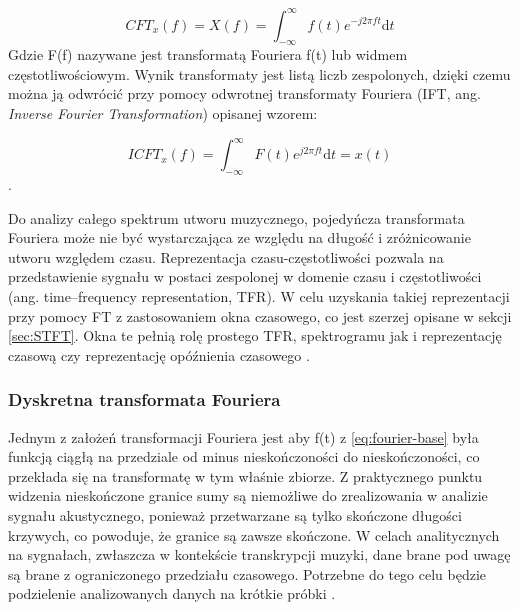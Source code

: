 \documentclass[12pt,a4paper,twoside]{mwart}
\begin{document}
\begin{equation} \label{eq:fourier-base}
CFT_x(f) = X(f) = \int_{-\infty}^{\infty}\textit{f}(t)e^ {-j2\pi ft}\mathrm{d}t
\end{equation}
Gdzie F(f) nazywane jest transformatą Fouriera f(t) lub widmem częstotliwościowym. Wynik transformaty jest listą liczb zespolonych, dzięki czemu można ją odwrócić przy pomocy odwrotnej transformaty Fouriera (IFT, ang. \textit{Inverse Fourier Transformation}) opisanej wzorem:

\begin{equation} \label{eq:inverse:fourier-base}
ICFT_x(f) = \int_{-\infty}^{\infty}\textit{F}(t)e^ {j2\pi ft}\mathrm{d}t = x(t)
\end{equation}
\cite{TransformacjaFourieraWroc}\cite{TransformacjaFourieraAgh}
\cite[22-25]{Transcription:Anssi:SignalProcessingMethods}
.

Do analizy całego spektrum utworu muzycznego, pojedyńcza transformata Fouriera może nie być wystarczająca ze względu na długość i zróżnicowanie utworu względem czasu. Reprezentacja czasu-częstotliwości pozwala na przedstawienie sygnału w postaci zespolonej w domenie czasu i częstotliwości (ang. time–frequency representation, TFR). W celu uzyskania takiej reprezentacji przy pomocy FT z zastosowaniem okna czasowego, co jest szerzej opisane w sekcji \ref{sec:STFT}. Okna te pełnią rolę prostego TFR, spektrogramu jak i reprezentację czasową czy reprezentację opóźnienia czasowego 
\cite[21-23]{Transcription:Anssi:SignalProcessingMethods}
.

\subsubsection{Dyskretna transformata Fouriera} \label{sec:DFT}
Jednym z założeń transformacji Fouriera jest aby f(t) z \ref{eq:fourier-base} była funkcją ciągłą na przedziale od minus nieskończoności do nieskończoności, co przekłada się na transformatę w tym właśnie zbiorze. Z praktycznego punktu widzenia nieskończone granice sumy są niemożliwe do zrealizowania w analizie sygnału akustycznego, ponieważ przetwarzane są tylko skończone długości krzywych, co powoduje, że granice są zawsze skończone. W celach analitycznych na sygnałach, zwłaszcza w kontekście transkrypcji muzyki, dane brane pod uwagę są brane z ograniczonego przedziału czasowego. Potrzebne do tego celu będzie podzielenie analizowanych danych na krótkie próbki \cite{TransformacjaFourieraWroc}\cite{TransformacjaFourieraelektronikab2b}.
\end{document}
